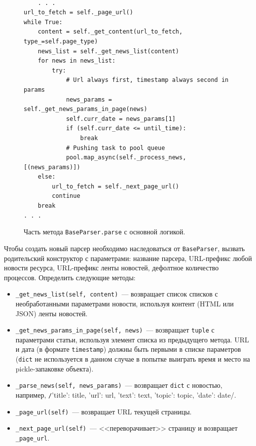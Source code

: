 \documentclass[a4paper, 14pt]{extarticle}
\begin{document}
\begin{figure}
	\centering
	\begin{verbatim}

	. . .
url_to_fetch = self._page_url()
while True:
	content = self._get_content(url_to_fetch, type_=self.page_type)
	news_list = self._get_news_list(content)
    for news in news_list:
        try:
            # Url always first, timestamp always second in params
            news_params = self._get_news_params_in_page(news)
            self.curr_date = news_params[1]
            if (self.curr_date <= until_time):
                break
            # Pushing task to pool queue
            pool.map_async(self._process_news, [(news_params)])
    else:
        url_to_fetch = self._next_page_url()
        continue
    break
. . .
	\end{verbatim}
	\caption{Часть метода \texttt{BaseParser.parse} с основной логикой.}
	\label{parse}
\end{figure}



Чтобы создать новый парсер необходимо наследоваться от \texttt{BaseParser}, вызвать родительский конструктор с параметрами: название парсера, URL-префикс любой новости ресурса, URL-префикс ленты новостей, дефолтное количество процессов. Определить следующие методы:
\begin{itemize}
	\item \texttt{\_get\_news\_list(self, content)}~--- возвращает список списков с необработанными параметрами новости, используя контент (HTML или JSON) ленты новостей.
	\item \texttt{\_get\_news\_params\_in\_page(self, news)}~--- возвращает \texttt{tuple} с параметрами статьи, используя элемент списка из предыдущего метода. URL и дата (в формате \texttt{timestamp}) должны быть первыми в списке параметров (\texttt{dict} не используется в данном случае в попытке выиграть время и место на pickle-запаковке объекта).
	\item \texttt{\_parse\_news(self, news\_params)}~--- возвращает \texttt{dict} с новостью, например, \texttt/{'title': title, 'url': url, 'text': text, 'topic': topic, 'date': date}/.
	\item \texttt{\_page\_url(self)}~--- возвращает URL текущей страницы.
	\item \texttt{\_next\_page\_url(self)}~--- <<переворачивает>> страницу и возвращает \texttt{\_page\_url}.
\end{itemize}
\end{document}
